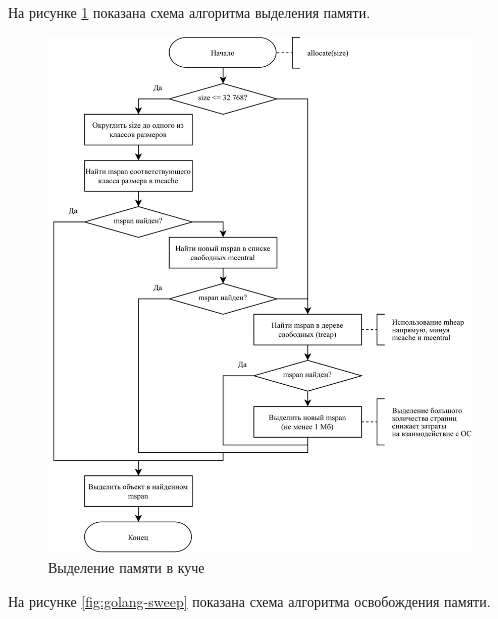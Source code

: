 На рисунке \ref{fig:golang-allocate} показана схема алгоритма выделения памяти.

\begin{figure}[H]
	\centering
	\includegraphics[scale=0.175]{assets/golang-allocate.png}
	\caption{Выделение памяти в куче}
	\label{fig:golang-allocate}
\end{figure}

На рисунке \ref{fig:golang-sweep} показана схема алгоритма освобождения памяти.

